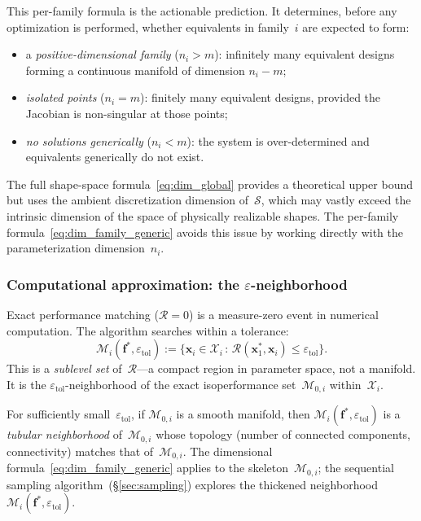 This per-family formula is the actionable prediction. It determines, before any optimization is performed, whether equivalents in family~$i$ are expected to form:
\begin{itemize}
    \item a \emph{positive-dimensional family} ($n_i > m$): infinitely many equivalent designs forming a continuous manifold of dimension $n_i - m$;
    \item \emph{isolated points} ($n_i = m$): finitely many equivalent designs, provided the Jacobian is non-singular at those points;
    \item \emph{no solutions generically} ($n_i < m$): the system is over-determined and equivalents generically do not exist.
\end{itemize}

\begin{remark}
The full shape-space formula~\eqref{eq:dim_global} provides a theoretical upper bound but uses the ambient discretization dimension of~$\mathcal{S}$, which may vastly exceed the intrinsic dimension of the space of physically realizable shapes. The per-family formula~\eqref{eq:dim_family_generic} avoids this issue by working directly with the parameterization dimension~$n_i$.
\end{remark}


\subsubsection{Computational approximation: the $\varepsilon$-neighborhood}
\label{sec:eps_neighborhood}

Exact performance matching ($\mathcal{R} = 0$) is a measure-zero event in numerical computation. The algorithm searches within a tolerance:
\begin{equation}
    \mathcal{M}_i(\mathbf{f}^*, \varepsilon_{\mathrm{tol}})
    := \bigl\{ \mathbf{x}_i \in \mathcal{X}_i \,:\,
    \mathcal{R}(\mathbf{x}_1^*, \mathbf{x}_i) \leq \varepsilon_{\mathrm{tol}} \bigr\}.
    \label{eq:approx_manifold}
\end{equation}
This is a \emph{sublevel set} of~$\mathcal{R}$---a compact region in parameter space, not a manifold. It is the $\varepsilon_{\mathrm{tol}}$-neighborhood of the exact isoperformance set~$\mathcal{M}_{0,i}$ within~$\mathcal{X}_i$.

For sufficiently small~$\varepsilon_{\mathrm{tol}}$, if $\mathcal{M}_{0,i}$ is a smooth manifold, then $\mathcal{M}_i(\mathbf{f}^*, \varepsilon_{\mathrm{tol}})$ is a \emph{tubular neighborhood} of~$\mathcal{M}_{0,i}$ whose topology (number of connected components, connectivity) matches that of~$\mathcal{M}_{0,i}$. The dimensional formula~\eqref{eq:dim_family_generic} applies to the skeleton~$\mathcal{M}_{0,i}$; the sequential sampling algorithm~(\S\ref{sec:sampling}) explores the thickened neighborhood~$\mathcal{M}_i(\mathbf{f}^*, \varepsilon_{\mathrm{tol}})$.


